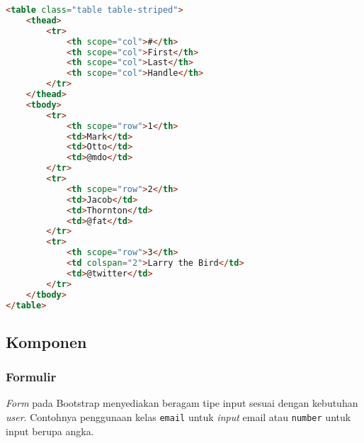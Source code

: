 \begin{lstlisting}[style=customhtml, language=HTML,  basicstyle=\ttfamily, frame=single, columns=fullflexible, keepspaces=true, breaklines=true, showstringspaces=false, label={lst:tablestripedBootstrap}, caption=Kode tabel dengan warna baris berbeda pada bootstrap 4.] 
<table class="table table-striped">
	<thead>
		<tr>
			<th scope="col">#</th>
			<th scope="col">First</th>
			<th scope="col">Last</th>
			<th scope="col">Handle</th>
		</tr>
	</thead>
	<tbody>
		<tr>
			<th scope="row">1</th>
			<td>Mark</td>
			<td>Otto</td>
			<td>@mdo</td>
		</tr>
		<tr>
			<th scope="row">2</th>
			<td>Jacob</td>
			<td>Thornton</td>
			<td>@fat</td>
		</tr>
		<tr>
			<th scope="row">3</th>
			<td colspan="2">Larry the Bird</td>
			<td>@twitter</td>
		</tr>
	</tbody>
</table>
\end{lstlisting}



\subsection{Komponen}
\subsubsection{Formulir}
\textit{Form} pada Bootstrap menyediakan beragam tipe input sesuai dengan kebutuhan \textit{user}. Contohnya penggunaan kelas \texttt{email} untuk \textit{input} email atau \texttt{number} untuk input berupa angka.
